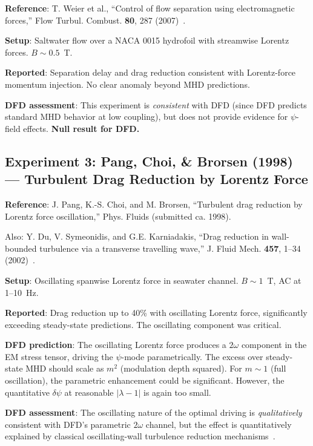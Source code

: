\documentclass[12pt,twocolumn]{article}
\newcommand{\dpsi}{\delta\psi}
\begin{document}
\textbf{Reference}: T. Weier et al., ``Control of flow separation using
electromagnetic forces,'' Flow Turbul. Combust. \textbf{80}, 287
(2007)~\cite{weier2007}.

\textbf{Setup}: Saltwater flow over a NACA 0015 hydrofoil with streamwise
Lorentz forces. $B \sim 0.5$~T.

\textbf{Reported}: Separation delay and drag reduction consistent with
Lorentz-force momentum injection. No clear anomaly beyond MHD predictions.

\textbf{DFD assessment}: This experiment is \emph{consistent} with DFD
(since DFD predicts standard MHD behavior at low coupling), but does not
provide evidence for $\psi$-field effects. \textbf{Null result for DFD.}

\subsection{Experiment 3: Pang, Choi, \& Brorsen (1998) --- Turbulent
Drag Reduction by Lorentz Force}

\textbf{Reference}: J. Pang, K.-S. Choi, and M. Brorsen, ``Turbulent drag
reduction by Lorentz force oscillation,'' Phys. Fluids (submitted ca. 1998).

Also: Y. Du, V. Symeonidis, and G.E. Karniadakis, ``Drag reduction in
wall-bounded turbulence via a transverse travelling wave,'' J. Fluid Mech.
\textbf{457}, 1--34 (2002)~\cite{du2002}.

\textbf{Setup}: Oscillating spanwise Lorentz force in seawater channel.
$B \sim 1$~T, AC at 1--10~Hz.

\textbf{Reported}: Drag reduction up to 40\% with oscillating Lorentz
force, significantly exceeding steady-state predictions. The oscillating
component was critical.

\textbf{DFD prediction}: The oscillating Lorentz force produces a $2\omega$
component in the EM stress tensor, driving the $\psi$-mode parametrically.
The excess over steady-state MHD should scale as $m^2$ (modulation depth
squared). For $m \sim 1$ (full oscillation), the parametric enhancement
could be significant. However, the quantitative $\dpsi$ at reasonable
$|\lambda - 1|$ is again too small.

\textbf{DFD assessment}: The oscillating nature of the optimal driving
is \emph{qualitatively} consistent with DFD's parametric $2\omega$ channel,
but the effect is quantitatively explained by classical oscillating-wall
turbulence reduction mechanisms~\cite{jung1992}.
\end{document}
